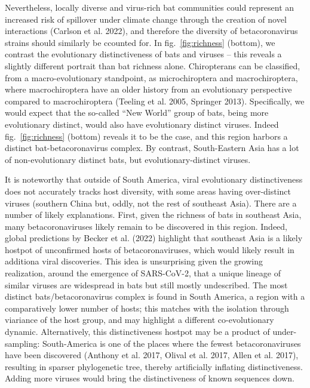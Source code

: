 \documentclass[11pt]{article}
\begin{document}
Nevertheless, locally diverse and virus-rich bat communities could
represent an increased risk of spillover under climate change through
the creation of novel interactions (Carlson et al. 2022), and therefore
the diversity of betacoronavirus strains should similarly be ccounted
for. In fig.~\ref{fig:richness} (bottom), we contrast the evolutionary
distinctiveness of bats and viruses -- this reveals a slightly different
portrait than bat richness alone. Chiropterans can be classified, from a
macro-evolutionary standpoint, as microchiroptera and macrochiroptera,
where macrochiroptera have an older history from an evolutionary
perspective compared to macrochiroptera (Teeling et al. 2005, Springer
2013). Specifically, we would expect that the so-called ``New World''
group of bats, being more evolutionary distinct, would also have
evolutionary distinct viruses. Indeed fig.~\ref{fig:richness} (bottom)
reveals it to be the case, and this region harbors a distinct
bat-betacoronavirus complex. By contrast, South-Eastern Asia has a lot
of non-evolutionary distinct bats, but evolutionary-distinct viruses.

It is noteworthy that outside of South America, viral evolutionary
distinctiveness does not accurately tracks host diversity, with some
areas having over-distinct viruses (southern China but, oddly, not the
rest of southeast Asia). There are a number of likely explanations.
First, given the richness of bats in southeast Asia, many
betacoronaviruses likely remain to be discovered in this region. Indeed,
global predictions by Becker et al. (2022) highlight that southeast Asia
is a likely hostpot of unconfirmed hosts of betacoronaviruses, which
would likely result in additiona viral discoveries. This idea is
unsurprising given the growing realization, around the emergence of
SARS-CoV-2, that a unique lineage of similar viruses are widespread in
bats but still mostly undescribed. The most distinct
bats/betacoronavirus complex is found in South America, a region with a
comparatively lower number of hosts; this matches with the isolation
through viariance of the host group, and may highlight a different
co-evolutionary dynamic. Alternatively, this distinctiveness hostpot may
be a product of under-sampling: South-America is one of the places where
the fewest betacoronaviruses have been discovered (Anthony et al. 2017,
Olival et al. 2017, Allen et al. 2017), resulting in sparser
phylogenetic tree, thereby artificially inflating distinctiveness.
Adding more viruses would bring the distinctiveness of known sequences
down.
\end{document}
